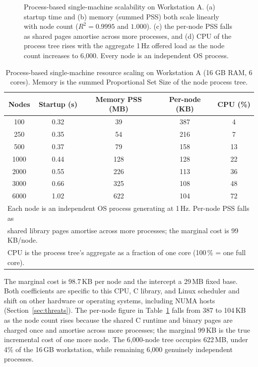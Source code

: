 \documentclass[jsan,article,submit,moreauthors,pdftex]{Definitions/mdpi}
\begin{document}
\begin{itemize}
\begin{figure}[H]
    \vspace{6pt}
    \caption{Process-based single-machine scalability on Workstation A. (a) startup time and (b) memory (summed PSS) both scale linearly with node count ($R^2=0.9995$ and $1.000$). (c) the per-node PSS falls as shared pages amortise across more processes, and (d) CPU of the process tree rises with the aggregate 1\,Hz offered load as the node count increases to 6{,}000. Every node is an independent OS process.}
    \label{fig:STGen_Scalability_Final}
\end{figure}
% 
\begin{table}[H]
\centering
\begin{tabular}{c c c c c}
\hline
\textbf{Nodes} & \textbf{Startup (s)} & \textbf{Memory PSS (MB)} & \textbf{Per-node (KB)} & \textbf{CPU (\%)} \\ \hline
100  & 0.32 & 39  & 387 & 4 \\
250  & 0.35 & 54  & 216 & 7 \\
500  & 0.37 & 79  & 158 & 13 \\
1000 & 0.44 & 128 & 128 & 22 \\
2000 & 0.55 & 226 & 113 & 36 \\
3000 & 0.66 & 325 & 108 & 48 \\
6000 & 1.02 & 622 & 104 & 72 \\
\hline
\multicolumn{5}{l}{\footnotesize{Each node is an independent OS process generating at 1\,Hz. Per-node PSS falls as}} \\
\multicolumn{5}{l}{\footnotesize{shared library pages amortise across more processes; the marginal cost is 99\,KB/node.}} \\
\multicolumn{5}{l}{\footnotesize{CPU is the process tree's aggregate as a fraction of one core (100\,\% = one full core).}} \\
\end{tabular}
\caption{Process-based single-machine resource scaling on Workstation A (16 GB RAM, 6 cores). Memory is the summed Proportional Set Size of the node process tree.}
\label{tab:scalability}
\end{table}


The marginal cost is 98.7\,KB per node and the intercept a 29\,MB fixed base. Both coefficients are specific to this CPU, C library, and Linux scheduler and shift on other hardware or operating systems, including NUMA hosts (Section~\ref{sec:threats}). The per-node figure in Table~\ref{tab:scalability} falls from 387 to 104\,KB as the node count rises because the shared C runtime and binary pages are charged once and amortise across more processes; the marginal 99\,KB is the true incremental cost of one more node. The 6{,}000-node tree occupies 622\,MB, under 4\% of the 16\,GB workstation, while remaining 6{,}000 genuinely independent processes.


\end{itemize}
\end{document}
